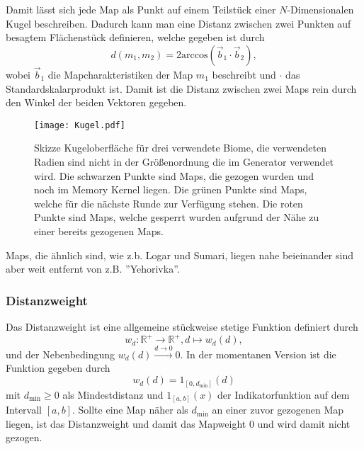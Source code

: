             Damit lässt sich jede Map als Punkt auf einem Teilstück einer $N$-Dimensionalen Kugel beschreiben.
            Dadurch kann man eine Distanz zwischen zwei Punkten auf besagtem Flächenstück definieren, welche gegeben ist durch
            \begin{equation}
                d(m_1, m_2) = 2\text{arccos}(\vec{b}_1\cdot\vec{b}_2),
            \end{equation}
            wobei $\vec{b}_1$ die Mapcharakteristiken der Map $m_1$ beschreibt und $\cdot$ das Standardskalarprodukt ist.
            Damit ist die Distanz zwischen zwei Maps rein durch den Winkel der beiden Vektoren gegeben.
            \begin{figure}[htbp]
                \centering
                \texttt{[image: Kugel.pdf]}
                \caption{Skizze Kugeloberfläche für drei verwendete Biome, die verwendeten Radien sind nicht in der Größenordnung die im Generator verwendet wird.
                            Die schwarzen Punkte sind Maps, die gezogen wurden und noch im Memory Kernel liegen.
                            Die grünen Punkte sind Maps, welche für die nächste Runde zur Verfügung stehen.
                            Die roten Punkte sind Maps, welche gesperrt wurden aufgrund der Nähe zu einer bereits gezogenen Maps.}
            \end{figure}
            Maps, die ähnlich sind, wie z.b. \glqq{}Logar\grqq{} und \glqq{}Sumari\grqq{}, liegen nahe beieinander sind aber weit entfernt von z.B. ''Yehorivka''.
        \subsubsection{Distanzweight}
            Das Distanzweight ist eine allgemeine stückweise stetige Funktion definiert durch
            \begin{equation}
                w_d : \mathbb{R}^+ \rightarrow \mathbb{R}^+, d \mapsto w_d(d),
            \end{equation}
            und der Nebenbedingung $w_d(d)\overset{d\rightarrow 0}{\longrightarrow}0$.
            In der momentanen Version ist die Funktion gegeben durch
            \begin{equation}
                w_d(d) = 1_{[0,d_\text{min}]}(d)
            \end{equation}
            mit $d_\text{min}\geq 0$ als Mindestdistanz und $1_{[a,b]}(x)$ der Indikatorfunktion auf dem Intervall $[a,b]$.
            Sollte eine Map näher als $d_\text{min}$ an einer zuvor gezogenen Map liegen, ist das Distanzweight und damit das Mapweight $0$ und wird damit nicht gezogen.

